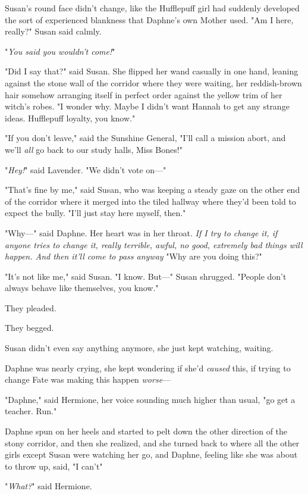 Susan's round face didn't change, like the Hufflepuff girl had suddenly
developed the sort of experienced blankness that Daphne's own Mother used. "Am
I here, really?" Susan said calmly.

"\emph{You said you wouldn't come!}"

"Did I say that?" said Susan. She flipped her wand casually in one hand,
leaning against the stone wall of the corridor where they were waiting, her
reddish-brown hair somehow arranging itself in perfect order against the yellow
trim of her witch's robes. "I wonder why. Maybe I didn't want Hannah to get any
strange ideas. Hufflepuff loyalty, you know."

"If you don't leave," said the Sunshine General, "I'll call a mission abort,
and we'll \emph{all} go back to our study halls, Miss Bones!"

"\emph{Hey!}" said Lavender. "We didn't vote on\mbox{---}"

"That's fine by me," said Susan, who was keeping a steady gaze on the other end
of the corridor where it merged into the tiled hallway where they'd been told
to expect the bully. "I'll just stay here myself, then."

"Why\mbox{---}" said Daphne. Her heart was in her throat. \emph{If I try to change it,
if \emph{anyone} tries to change it, really terrible, awful, no good, extremely
bad things will happen. And then it'll come to pass anyway{\el}} "Why are
you doing this?"

"It's not like me," said Susan. "I know. But\mbox{---}" Susan shrugged. "People don't
always behave like themselves, you know."

They pleaded.

They begged.

Susan didn't even say anything anymore, she just kept watching, waiting.

Daphne was nearly crying, she kept wondering if she'd \emph{caused} this, if
trying to change Fate was making this happen \emph{worse}\mbox{---}

"Daphne," said Hermione, her voice sounding much higher than usual, "go get a
teacher. Run."

Daphne spun on her heels and started to pelt down the other direction of the
stony corridor, and then she realized, and she turned back to where all the
other girls except Susan were watching her go, and Daphne, feeling like she was
about to throw up, said, "I can't{\el}"

"\emph{What?}" said Hermione.

